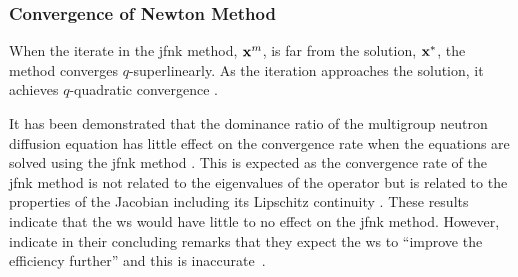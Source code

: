     \subsubsection{Convergence of Newton Method}

      When the iterate in the \gls{jfnk} method, $\mathbf{x}^m$, is far from the
      solution, $\mathbf{x}^*$, the method converges $q$-superlinearly. As the
      iteration approaches the solution, it achieves $q$-quadratic convergence
      \cite{textbookkelley}.

      It has been demonstrated that the dominance ratio of the multigroup
      neutron diffusion equation has little effect on the convergence rate when
      the equations are solved using the \gls{jfnk} method \cite{gill_azmy}.
      This is expected as the convergence rate of the \gls{jfnk} method is not
      related to the eigenvalues of the operator but is related to the
      properties of the Jacobian including its Lipschitz continuity
      \cite{textbookkelley}. These results indicate that the \gls{ws} would have
      little to no effect on the \gls{jfnk} method. However,
      \citeauthor{qe2paper} indicate in their concluding remarks that they
      expect the \gls{ws} to ``improve the efficiency further'' and this is
      inaccurate~\cite{qe2paper}.
